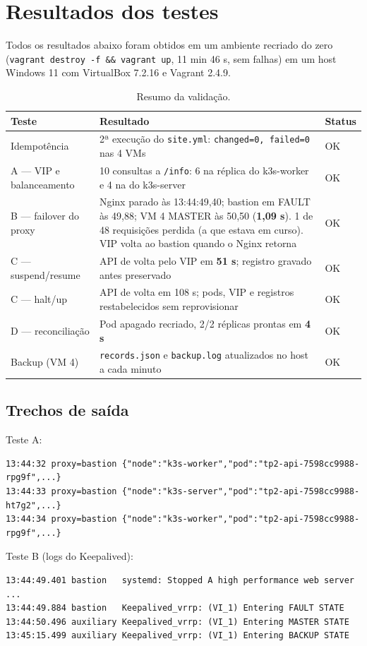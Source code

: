 \documentclass[11pt,a4paper]{article}
\begin{document}
\section{Resultados dos testes}
Todos os resultados abaixo foram obtidos em um ambiente recriado do zero
(\texttt{vagrant destroy -f \&\& vagrant up}, 11 min 46 s, sem falhas) em um host Windows 11
com VirtualBox 7.2.16 e Vagrant 2.4.9.

\begin{table}[h]
\centering
\begin{tabularx}{\textwidth}{lXl}
\toprule
Teste & Resultado & Status \\
\midrule
Idempotência & 2ª execução do \texttt{site.yml}: \texttt{changed=0, failed=0} nas 4 VMs & OK \\
A --- VIP e balanceamento & 10 consultas a \texttt{/info}: 6 na réplica do k3s-worker e 4 na do k3s-server & OK \\
B --- failover do proxy & Nginx parado às 13:44:49,40; bastion em FAULT às 49,88; VM 4 MASTER às 50,50 (\textbf{1,09 s}). 1 de 48 requisições perdida (a que estava em curso). VIP volta ao bastion quando o Nginx retorna & OK \\
C --- suspend/resume & API de volta pelo VIP em \textbf{51 s}; registro gravado antes preservado & OK \\
C --- halt/up & API de volta em 108 s; pods, VIP e registros restabelecidos sem reprovisionar & OK \\
D --- reconciliação & Pod apagado recriado, 2/2 réplicas prontas em \textbf{4 s} & OK \\
Backup (VM 4) & \texttt{records.json} e \texttt{backup.log} atualizados no host a cada minuto & OK \\
\bottomrule
\end{tabularx}
\caption{Resumo da validação.}
\end{table}

\subsection*{Trechos de saída}
Teste A:
\begin{lstlisting}
13:44:32 proxy=bastion {"node":"k3s-worker","pod":"tp2-api-7598cc9988-rpg9f",...}
13:44:33 proxy=bastion {"node":"k3s-server","pod":"tp2-api-7598cc9988-ht7g2",...}
13:44:34 proxy=bastion {"node":"k3s-worker","pod":"tp2-api-7598cc9988-rpg9f",...}
\end{lstlisting}

Teste B (logs do Keepalived):
\begin{lstlisting}
13:44:49.401 bastion   systemd: Stopped A high performance web server ...
13:44:49.884 bastion   Keepalived_vrrp: (VI_1) Entering FAULT STATE
13:44:50.496 auxiliary Keepalived_vrrp: (VI_1) Entering MASTER STATE
13:45:15.499 auxiliary Keepalived_vrrp: (VI_1) Entering BACKUP STATE
\end{lstlisting}
\end{document}
